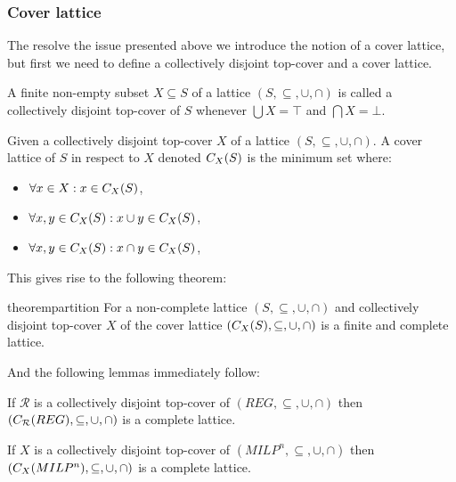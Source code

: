 \subsubsection{Cover lattice}

The resolve the issue presented above we introduce the notion of a cover lattice, but first we need to define a collectively disjoint top-cover and a cover lattice.

\begin{definition}
    A finite non-empty subset $X \subseteq S$ of a lattice $(S, \subseteq, \cup, \cap)$ is called a collectively disjoint top-cover of $S$ whenever $\bigcup X = \top$ and $\bigcap X = \bot$.
\end{definition}

\begin{definition}\label{def:coverlattice}
Given a collectively disjoint top-cover $X$ of a lattice $(S, \subseteq, \cup, \cap)$.
A cover lattice of $S$ in respect to $X$ denoted $C_{X}(S)$ is the minimum set where:
\begin{itemize}
    \item $\forall x \in X: x \in C_{X}(S)$,
    \item $\forall x, y \in C_{X}(S) : x \cup y \in C_{X}(S)$,
    \item $\forall x, y \in C_{X}(S) : x \cap y \in C_{X}(S)$,
\end{itemize}
\end{definition}

This gives rise to the following theorem:

\begin{restatable}{theorem}{partition}\label{thm:partition}
For a non-complete lattice $(S, \subseteq, \cup, \cap)$ and collectively disjoint top-cover $X$ of the cover lattice $(C_{X}(S), \subseteq, \cup, \cap)$ is a finite and complete lattice.
\end{restatable}

And the following lemmas immediately follow:

\begin{lemma}
    If $\mathcal{R}$ is a collectively disjoint top-cover of $(REG, \subseteq, \cup, \cap)$ then $(C_{\mathcal{R}}(REG), \subseteq, \cup, \cap)$ is a complete lattice.
\end{lemma}

\begin{lemma}
    If $X$ is a collectively disjoint top-cover of $(MILP^n, \subseteq, \cup, \cap)$ then $(C_{X}(MILP^n), \subseteq, \cup, \cap)$ is a complete lattice.
\end{lemma}


